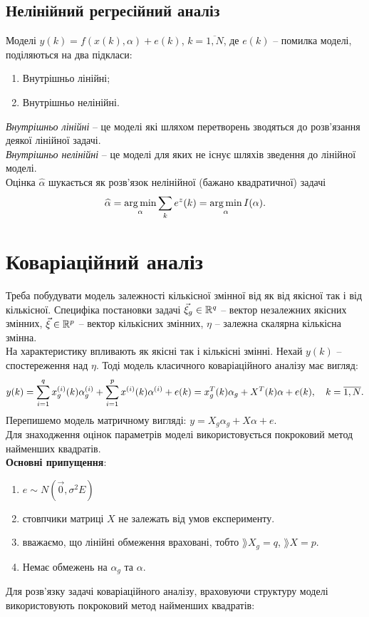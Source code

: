 \subsection{Нелінійний регресійний аналіз}
Моделі $y(k)=f(x(k),\alpha)+e(k)$, $k=\overline{1,N}$, де $e(k)$ -- помилка моделі, поділяються на два підкласи:
\begin{enumerate}
	\item Внутрішньо лінійні;
	\item Внутрішньо нелінійні.
\end{enumerate}
\textit{Внутрішньо лінійні} -- це моделі які шляхом перетворень зводяться до розв’язання деякої лінійної задачі. \\
\textit{Внутрішньо нелінійні} -- це моделі для яких не існує шляхів зведення до лінійної моделі. \\

Оцінка $\widehat{\alpha}$ шукається як розв'язок нелінійної (бажано квадратичної) задачі \[ \widehat{\alpha}=\operatorname*{arg\,min}_\alpha \displaystyle\sum\limits_k e^z(k) = \operatorname*{arg\,min}_\alpha I(\alpha). \]
\section{Коваріаційний аналіз}
Треба побудувати модель залежності кількісної змінної від як від якісної так і від кількісної. Специфіка постановки задачі $\vec \xi_g \in \mathbb{R}^q$ -- вектор незалежних якісних змінних, $\vec\xi\in\mathbb{R}^p$ -- вектор кількісних змінних, $\eta$ -- залежна скалярна кількісна змінна. \\

На характеристику впливають як якісні так і кількісні змінні. Нехай $y(k)$ -- спостереження над $\eta$. Тоді модель класичного коваріаційного аналізу має вигляд: \[ y(k) = \displaystyle\sum\limits_{i=1}^q x_g^{(i)}(k)\alpha_g^{(i)} + \displaystyle\sum\limits_{i=1}^p x^{(i)}(k)\alpha^{(i)}+e(k)=x_g^T(k)\alpha_g + X^T(k)\alpha+e(k), \quad k = \overline{1,N}. \]
Перепишемо модель матричному вигляді: $y = X_g \alpha_g + X \alpha + e$. \\

Для знаходження оцінок параметрів моделі використовується покроковий метод найменших квадратів. \\

\textbf{Основні припущення}:
\begin{enumerate}
	\item $e \sim N(\vec0,\sigma^2E)$
	\item стовпчики матриці $X$ не залежать від умов експерименту.
	\item вважаємо, що лінійні обмеження враховані, тобто $\rang X_g = q$, $\rang X = p$.
	\item Немає обмежень на $\alpha_g$ та $\alpha$.
\end{enumerate}
Для розв’язку задачі коваріаційного аналізу, враховуючи структуру моделі використовують покроковий метод найменших квадратів:
